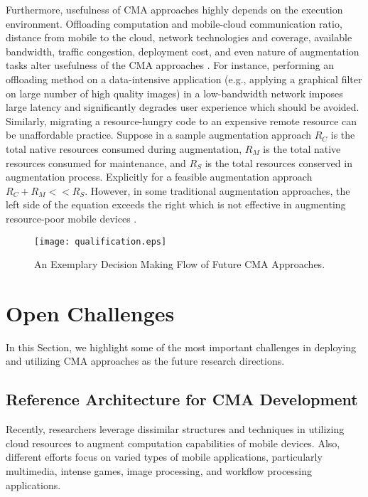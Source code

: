 \documentclass[publish]{IEEEtran}
\begin{document}
Furthermore, usefulness of CMA approaches highly depends on the execution environment. Offloading computation and mobile-cloud communication ratio, distance from mobile to the cloud, network technologies and coverage, available bandwidth, traffic congestion, deployment cost, and even nature of augmentation tasks alter usefulness of the CMA approaches \cite{Kumar2010}. For instance, performing an offloading method on a data-intensive application (e.g., applying a graphical filter on large number of high quality images) in a low-bandwidth network imposes large latency and significantly degrades user experience which should be avoided. Similarly, migrating a resource-hungry code to an expensive remote resource can be unaffordable practice. Suppose in a sample augmentation approach $R_{C}$ is the total native resources consumed during augmentation, $R_{M}$ is the total native resources consumed for maintenance, and $R_{S}$ is the total resources conserved in augmentation process. Explicitly for a feasible augmentation approach $R_{C} + R_{M} << R_{S}$. However, in some traditional augmentation approaches, the left side of the equation exceeds the right which is not effective in augmenting resource-poor mobile devices \cite{Sharifi2011}. 

\begin{figure}[t]
\begin{center}
\texttt{[image: qualification.eps]}
\caption{An Exemplary Decision Making Flow of Future CMA Approaches.} \label{qualification}
\end{center}
\end{figure}


\section{Open Challenges} \label{openissues}
In this Section, we highlight some of the most important challenges in deploying and utilizing CMA approaches as the future research directions.

\subsection{Reference Architecture for CMA Development}
Recently, researchers leverage dissimilar structures and techniques in utilizing cloud resources to augment computation capabilities of mobile devices. Also, different efforts focus on varied types of mobile applications, particularly multimedia, intense games, image processing, and workflow processing applications. 
\end{document}
